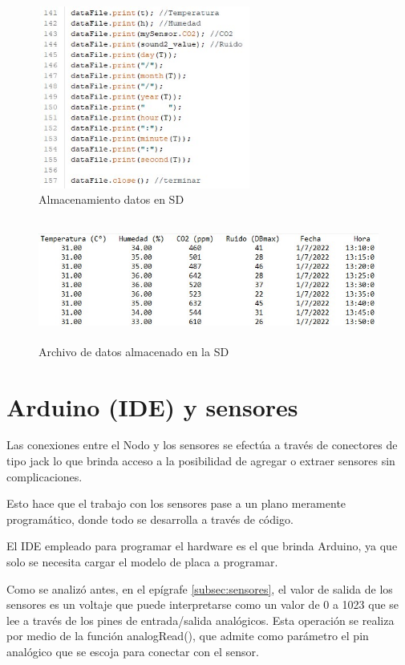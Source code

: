 \begin{figure}[H]
    \centering
    \includegraphics[width=7cm, height=6cm]{imagenes/codigo SD.jpg}
    \caption{Almacenamiento datos en SD}
    \label{imag:almacenamiento_SD}
\end{figure}

\begin{figure}[H]
    \centering
    \includegraphics[width=12.5cm, height=4cm]{imagenes/archivo txt.jpg}
    \caption{Archivo de datos almacenado en la SD}
    \label{imag:datos_en_SD}
\end{figure}

\section{Arduino (IDE) y sensores}

Las conexiones entre el Nodo y los sensores se efectúa a través de conectores de tipo jack lo que brinda acceso a la posibilidad de agregar o extraer sensores sin complicaciones.

Esto hace que el trabajo con los sensores pase a un plano meramente programático, donde todo se desarrolla a través de código.

El IDE empleado para programar el hardware es el que brinda Arduino, ya que solo se necesita cargar el modelo de placa a programar.

Como se analizó antes, en el epígrafe \ref{subsec:sensores}, el valor de salida de los sensores es un voltaje que puede interpretarse como un valor de 0 a 1023 que se lee a través de los pines de entrada/salida analógicos.
Esta operación se realiza por medio de la función analogRead(), que admite como parámetro el pin analógico que se escoja para conectar con el sensor.

